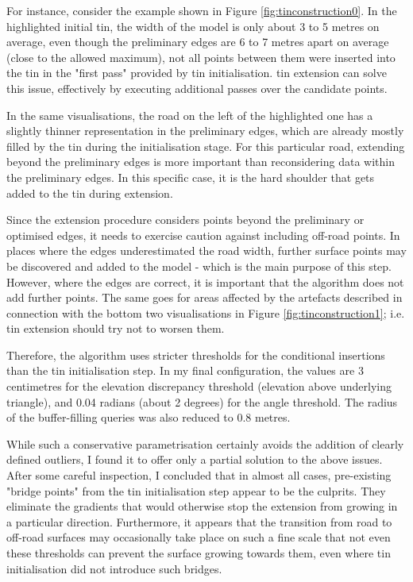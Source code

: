 For instance, consider the example shown in Figure \ref{fig:tinconstruction0}. In the highlighted initial \ac{tin}, the width of the model is only about 3 to 5 metres on average, even though the preliminary edges are 6 to 7 metres apart on average (close to the allowed maximum), not all points between them were inserted into the \ac{tin} in the "first pass" provided by \ac{tin} initialisation. \ac{tin} extension can solve this issue, effectively by executing additional passes over the candidate points.

In the same visualisations, the road on the left of the highlighted one has a slightly thinner representation in the preliminary edges, which are already mostly filled by the \ac{tin} during the initialisation stage. For this particular road, extending beyond the preliminary edges is more important than reconsidering data within the preliminary edges. In this specific case, it is the hard shoulder that gets added to the \ac{tin} during extension.

Since the extension procedure considers points beyond the preliminary or optimised edges, it needs to exercise caution against including off-road points. In places where the edges underestimated the road width, further surface points may be discovered and added to the model - which is the main purpose of this step. However, where the edges are correct, it is important that the algorithm does not add further points. The same goes for areas affected by the artefacts described in connection with the bottom two visualisations in Figure \ref{fig:tinconstruction1}; i.e. \ac{tin} extension should try not to worsen them.

Therefore, the algorithm uses stricter thresholds for the conditional insertions than the \ac{tin} initialisation step. In my final configuration, the values are 3 centimetres for the elevation discrepancy threshold (elevation above underlying triangle), and 0.04 radians (about 2 degrees) for the angle threshold. The radius of the buffer-filling queries was also reduced to 0.8 metres.

While such a conservative parametrisation certainly avoids the addition of clearly defined outliers, I found it to offer only a partial solution to the above issues. After some careful inspection, I concluded that in almost all cases, pre-existing "bridge points" from the \ac{tin} initialisation step appear to be the culprits. They eliminate the gradients that would otherwise stop the extension from growing in a particular direction. Furthermore, it appears that the transition from road to off-road surfaces may occasionally take place on such a fine scale that not even these thresholds can prevent the surface growing towards them, even where \ac{tin} initialisation did not introduce such bridges.


